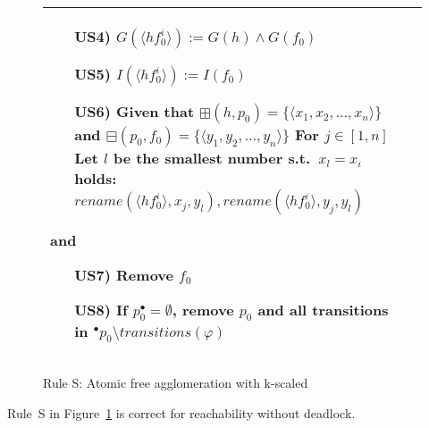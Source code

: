 \begin{figure}
\begin{adjustbox}{center}
\begin{tabular}{|p{70mm}|p{70mm}|}
\begin{itemize}[leftmargin=10mm]
            \item[US4)] $G(\langle hf_0^i\rangle):= G(h) \land G(f_0)$
            \item[US5)] $I(\langle hf_0^i\rangle):= I(f_0)$
            \item[US6)] Given that $\boxplus(h,p_0) = \{\langle x_1, x_2, \dots, x_n \rangle\}$ and $\boxminus(p_0, f_0) = \{\langle y_1, y_2, \dots, y_n \rangle\}$\newline
            For $j\in[1,n]$\newline
            Let $l$ be the smallest number s.t.\ $x_l = x_i$ holds:\newline
            $rename(\langle hf_0^i \rangle, x_j, y_l), rename(\langle hf_0^i \rangle, y_j, y_l)$
        \end{itemize}
        and
        \begin{itemize}[leftmargin=10mm]
            \item[US7)] Remove $f_0$
            \item[US8)] If $p_0^\bullet = \emptyset$, remove $p_0$ and all transitions in ${}^\bullet p_0\setminus transitions(\varphi)$
        \end{itemize} \\ \hline
        \end{tabular}
    \end{adjustbox}
    \caption{Rule S: Atomic free agglomeration with k-scaled}
    \label{fig:rule_s_cpn}
\end{figure}

\begin{theorem}
    Rule~S in Figure~\ref{fig:rule_s_cpn} is correct for reachability without deadlock.
\end{theorem}
